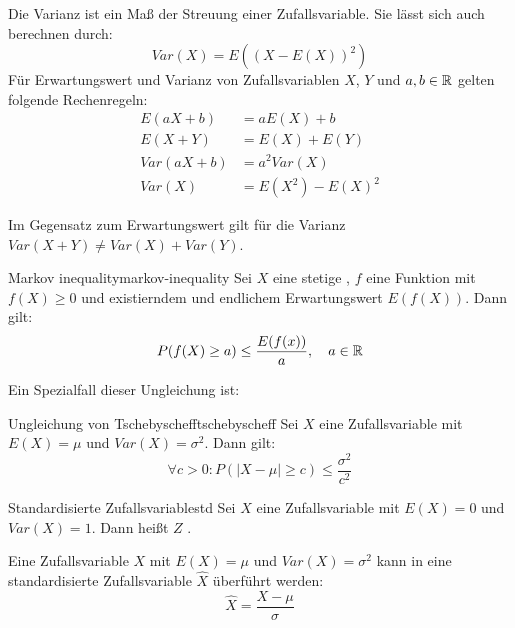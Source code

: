 Die Varianz ist ein Maß der Streuung einer Zufallsvariable. Sie lässt sich auch
berechnen durch:
\[Var(X) = E((X-E(X))^2)\]
Für Erwartungswert und Varianz von Zufallsvariablen $X$, $Y$ und $a,b\in\mathbb{R}$ gelten
folgende Rechenregeln:
\begin{align*}
E(aX+b) &= aE(X) + b \\
E(X+Y) &= E(X) + E(Y) \\
Var(aX+b) &= a^2 Var(X) \\
Var(X) &= E(X^2) - E(X)^2
\end{align*}

Im Gegensatz zum Erwartungswert gilt für die Varianz $Var(X+Y) \ne Var(X) +
Var(Y)$.

\begin{theorem}{Markov inequality}{markov-inequality}
Sei $X$ eine stetige , $f$ eine Funktion mit
$f(X)\ge 0$ und existierndem und endlichem Erwartungswert $E(f(X))$. Dann gilt:
\[P(f(X)\ge a)\le \frac{E(f(x))}{a},\quad a\in\mathbb{R}\]
\end{theorem}
Ein Spezialfall dieser Ungleichung ist:
\begin{theorem}{Ungleichung von Tschebyscheff}{tschebyscheff}
Sei $X$ eine Zufallsvariable mit $E(X) = \mu$ und $Var(X) = \sigma^2$. Dann
gilt:
\[\forall c>0: P(|X-\mu|\ge c) \le\frac{\sigma^2}{c^2}\]
\end{theorem}

\begin{definition}{Standardisierte Zufallsvariable}{std}
Sei $X$ eine Zufallsvariable mit $E(X) = 0$ und $Var(X) = 1$. Dann heißt $Z$
.
\end{definition}

Eine Zufallsvariable $X$ mit $E(X) = \mu$ und $Var(X)=\sigma^2$ kann in eine
standardisierte Zufallsvariable $\hat{X}$ überführt werden:
\[\hat{X} = \frac{X-\mu}{\sigma}\]
